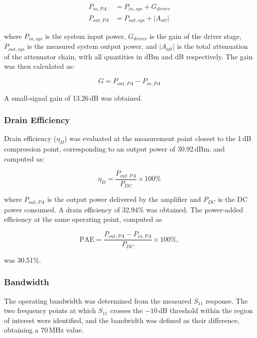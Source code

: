 \begin{align}
    P_{in,PA}  &= P_{in,sys} + G_{driver} \label{eq_pin} \\
    P_{out,PA} &= P_{out,sys} + |A_{att}| \label{eq_pout}
\end{align}

where $P_{in,sys}$ is the system input power, $G_{driver}$ is the gain of the driver stage, $P_{out,sys}$ is the measured system output power, and $|A_{att}|$ is the total attenuation of the attenuator chain, with all quantities in dBm and dB respectively. The gain was then calculated as:

\begin{equation}
    G = P_{out,PA} - P_{in,PA}
    \label{eq_gain}
\end{equation}

A small-signal gain of 13.26\,dB was obtained.

\subsubsection{Drain Efficiency}
Drain efficiency ($\eta_D$) was evaluated at the measurement point closest to the 1\,dB compression point, corresponding to an output power of 30.92\,dBm, and computed as:

\begin{equation}
    \eta_D = \frac{P_{out,PA}}{P_{DC}} \times 100\%
    \label{eq_eta}
\end{equation}

where $P_{out,PA}$ is the output power delivered by the amplifier and $P_{DC}$
is the DC power consumed. A drain efficiency of 32.94\% was obtained. The power-added efficiency at the same operating point, computed as

\begin{equation}
    \text{PAE} = \frac{P_{out,PA} - P_{in,PA}}{P_{DC}} \times 100\%,
    \label{eq_pae}
\end{equation}

was 30.51\%.

\subsubsection{Bandwidth}
The operating bandwidth was determined from the measured $S_{11}$ response. The two frequency points at which $S_{11}$ crosses the $-10$\,dB threshold within the region of interest were identified, and the bandwidth was defined as their difference, obtaining a 70\,MHz value.

